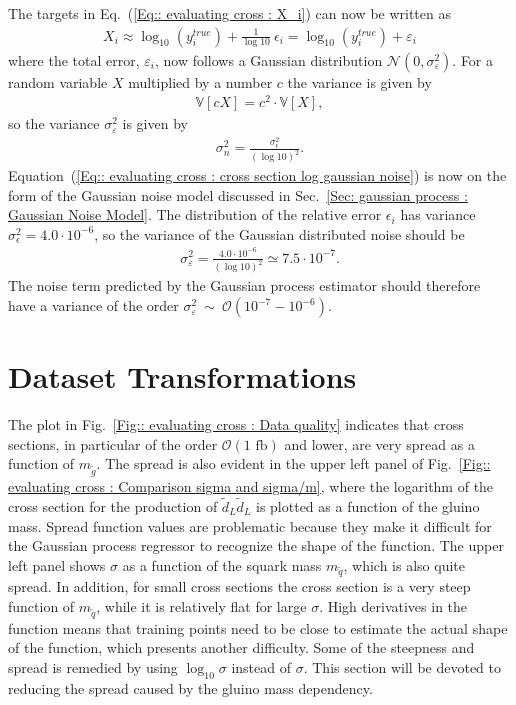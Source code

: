 \documentclass[twoside,english]{uiofysmaster}
\begin{document}
{The targets in Eq.~(\ref{Eq:: evaluating cross : X_i}) can now be written as
\begin{align}\label{Eq:: evaluating cross : cross section log gaussian noise}
X_i \approx \log_{10}(y_i^{true}) + \frac{1}{\log 10} ~\epsilon_i = \log_{10}(y_i^{true}) + \varepsilon_i 
\end{align}
where the total error, $\varepsilon_i$, now follows a Gaussian distribution $\mathcal{N}(0, \sigma_{\varepsilon}^2)$. For a random variable $X$ multiplied by a number $c$ the variance is given by
\begin{align}
\mathbb{V}[c X] = c^2 \cdot \mathbb{V}[X],
\end{align}
so the variance $\sigma_{\varepsilon}^2$ is given by
\begin{align}
\sigma_n^2 = \frac{\sigma_{\epsilon}^2}{(\log 10)^2}.
\end{align}
Equation~(\ref{Eq:: evaluating cross : cross section log gaussian noise}) is now on the form of the Gaussian noise model discussed in Sec.~\ref{Sec: gaussian process : Gaussian Noise Model}. The distribution of the relative error $\epsilon_i$ has variance $\sigma_{\epsilon}^2 = 4.0 \cdot 10^{-6}$, so the variance of the Gaussian distributed noise should be
\begin{align*}
\sigma_{\varepsilon}^2 =  \frac{4.0 \cdot 10^{-6}}{(\log 10)^2} \simeq 7.5 \cdot 10^{-7}.
\end{align*}
The noise term predicted by the Gaussian process estimator should therefore have a variance of the order $\sigma_{\varepsilon}^2~\sim~\mathcal{O}(10^{-7}- 10^{-6})$.


\section{Dataset Transformations}

The plot in Fig.~\ref{Fig:: evaluating cross : Data quality} indicates that cross sections, in particular of the order $\mathcal{O}(1 \text{ fb})$ and lower, are very spread as a function of $m_{\widetilde{g}}$. The spread is also evident in the upper left panel of Fig.~\ref{Fig:: evaluating cross : Comparison sigma and sigma/m}, where the logarithm of the cross section for the production of $\widetilde{d}_L \widetilde{d}_L$ is plotted as a function of the gluino mass. Spread function values are problematic because they make it difficult for the Gaussian process regressor to recognize the shape of the function. The upper left panel shows $\sigma$ as a function of the squark mass $m_{\widetilde{q}}$, which is also quite spread. In addition, for small cross sections the cross section is a very steep function of $m_{\widetilde{q}}$, while it is relatively flat for large $\sigma$. High derivatives in the function means that training points need to be close to estimate the actual shape of the function, which presents another difficulty. Some of the steepness and spread is remedied by using $\log_{10} \sigma$ instead of $\sigma$. This section will be devoted to reducing the spread caused by the gluino mass dependency.

}
\end{document}
